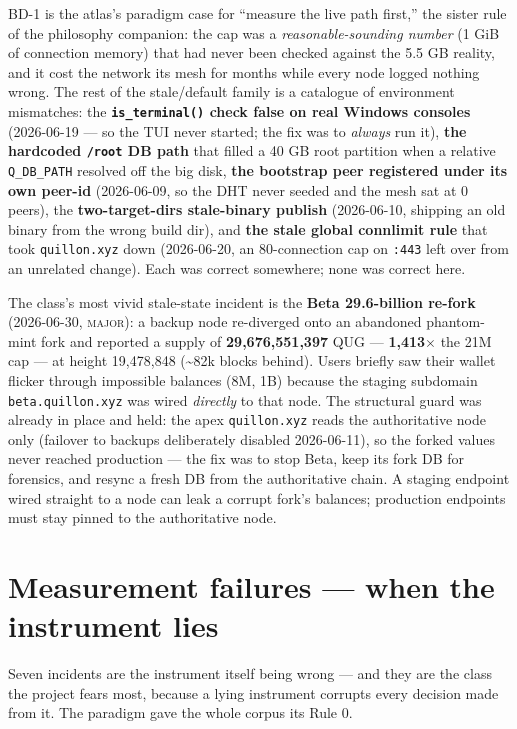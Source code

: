 \documentclass[10pt,a4paper]{article}
\newcommand{\measured}[1]{\textcolor{sigilcyan}{\textbf{#1}}}
\newcommand{\svM}{{\scriptsize\textcolor{sigilamber}{\textsc{major}}}}
\begin{document}
BD-1 is the atlas's paradigm case for ``measure the live path first,'' the sister rule of
the philosophy companion: the cap was a \emph{reasonable-sounding number} (1 GiB of
connection memory) that had never been checked against the 5.5 GB reality, and it cost
the network its mesh for months while every node logged nothing wrong. The rest of the
stale/default family is a catalogue of environment mismatches: the
\textbf{\texttt{is\_terminal()} check false on real Windows consoles} (2026-06-19 — so
the TUI never started; the fix was to \emph{always} run it), \textbf{the hardcoded
\texttt{/root} DB path} that filled a 40 GB root partition when a relative
\texttt{Q\_DB\_PATH} resolved off the big disk, \textbf{the bootstrap peer registered
under its own peer-id} (2026-06-09, so the DHT never seeded and the mesh sat at 0 peers),
the \textbf{two-target-dirs stale-binary publish} (2026-06-10, shipping an old binary
from the wrong build dir), and \textbf{the stale global connlimit rule} that took
\texttt{quillon.xyz} down (2026-06-20, an 80-connection cap on \texttt{:443} left over
from an unrelated change). Each was correct somewhere; none was correct here.

The class's most vivid stale-state incident is the \textbf{Beta 29.6-billion re-fork}
(2026-06-30, \svM): a backup node re-diverged onto an abandoned phantom-mint fork and
reported a supply of \measured{29{,}676{,}551{,}397} QUG — \measured{1{,}413$\times$} the
21M cap — at height 19{,}478{,}848 (\textasciitilde82k blocks behind). Users briefly saw
their wallet flicker through impossible balances (8M, 1B) because the staging subdomain
\texttt{beta.quillon.xyz} was wired \emph{directly} to that node. The structural guard was
already in place and held: the apex \texttt{quillon.xyz} reads the authoritative node
only (failover to backups deliberately disabled 2026-06-11), so the forked values never
reached production — the fix was to stop Beta, keep its fork DB for forensics, and resync
a fresh DB from the authoritative chain. A staging endpoint wired straight to a node can
leak a corrupt fork's balances; production endpoints must stay pinned to the authoritative
node.

\section{Measurement failures — when the instrument lies}\label{sec:measurement}

Seven incidents are the instrument itself being wrong — and they are the class the
project fears most, because a lying instrument corrupts every decision made from it. The
paradigm gave the whole corpus its Rule 0.
\end{document}
